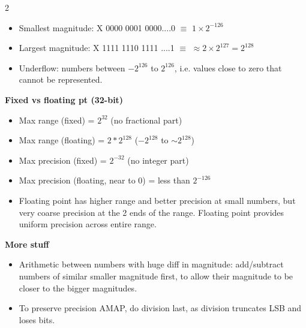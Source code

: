 \documentclass[10pt]{article}
\begin{document}
\begin{multicols}{2}
\begin{itemize}
\begin{itemize}
        \item Smallest magnitude: X 0000 0001 0000....0 $\equiv$ $1 \times 2^{-126}$
        \item Largest magnitude: X 1111 1110 1111 ....1 $\equiv$ $\approx 2 \times 2^{127} = 2^{128}$
        \item Underflow: numbers between $-2^{126}$ to $2^{126}$, i.e. values close to zero that cannot be represented.
    \end{itemize}
\end{itemize}
\textbf{Fixed vs floating pt (32-bit)}
\begin{itemize}
    \item Max range (fixed) = $2^{32}$ (no fractional part)
    \item Max range (floating) = $2*2^{128}$ ($-2^{128}$ to $\sim 2^{128}$)
    \item Max precision (fixed) = $2^{-32}$ (no integer part)
    \item Max precision (floating, near to 0) = less than $2^{-126}$
    \item Floating point has higher range and better precision at small numbers, but very coarse precision at the 2 ends of the range. Floating point provides uniform precision across entire range.
\end{itemize}
\textbf{More stuff}
\begin{itemize}
    \item Arithmetic between numbers with huge diff in magnitude: add/subtract numbers of similar smaller magnitude first, to allow their magnitude to be closer to the bigger magnitudes.
    \item To preserve precision AMAP, do division last, as division truncates LSB and loses bits.
\end{itemize}


\end{multicols}
\end{document}
